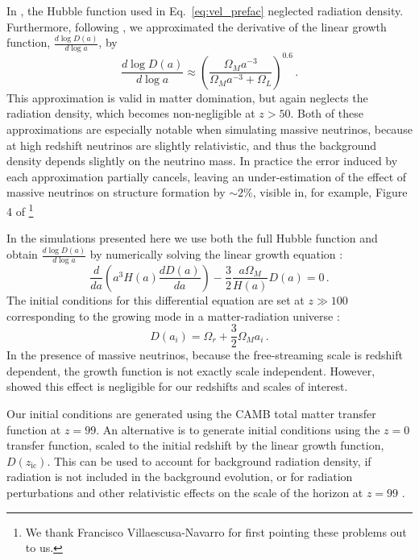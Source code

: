 \documentclass[useAMS, usenatbib]{mnras}
\begin{document}
In \cite{AHB}, the Hubble function used in Eq.~\ref{eq:vel_prefac}
neglected radiation density. Furthermore, following \cite{Bouchet:1995}, we 
approximated the derivative of the linear growth function, $\frac{d \log D(a)}{d \log a}$, by 
\begin{equation}
\frac{d \log D(a)}{d \log a} \approx \left(\frac{\Omega_M a^{-3}}{\Omega_M  a^{-3} + \Omega_L}\right)^{0.6}\,.
\end{equation}
This approximation is valid in matter domination, but again neglects the radiation density,
which becomes non-negligible at $z > 50$. Both of these approximations are especially notable
when simulating massive neutrinos, because at high redshift neutrinos are slightly relativistic,
and thus the background density depends slightly on the neutrino mass. In practice the error 
induced by each approximation partially cancels, leaving an under-estimation of the effect of 
massive neutrinos on structure formation by $\sim 2 \%$, visible in, for example, 
Figure 4 of \cite{AHB}\footnote{We thank Francisco Villaescusa-Navarro for first pointing these problems out to us.}

In the simulations presented here we use both the full Hubble function
and obtain $\frac{d \log D(a)}{d \log a}$ by numerically solving
the linear growth equation \citep{Peebles:1993}:
\begin{equation}
\frac{d}{da}\left(a^3 H(a) \frac{d D(a)}{da}\right) - \frac{3}{2} \frac{a \Omega_M}{H(a)} D(a) = 0\,.
\end{equation}
The initial conditions for this differential equation are set at $z \gg 100$ corresponding
to the growing mode in a matter-radiation universe \citep{Groth:1975}:
\begin{equation}
  D(a_i) = \Omega_r + \frac{3}{2} \Omega_M a_i\,.
\end{equation}
In the presence of massive neutrinos, because the free-streaming scale is redshift dependent, 
the growth function is not exactly scale independent. However, \cite{Zennaro_2017} showed this
effect is negligible for our redshifts and scales of interest.

Our initial conditions are generated using the CAMB total matter transfer
function at $z=99$. An alternative is to generate initial conditions
using the $z=0$ transfer function, scaled to the initial redshift by the 
linear growth function, $D(z_\mathrm{ic})$. This can
be used to account for background radiation density, if radiation is not included
in the background evolution, or for radiation perturbations and other relativistic
effects on the scale of the horizon at $z=99$ \citep{Zennaro_2017}.
\end{document}
